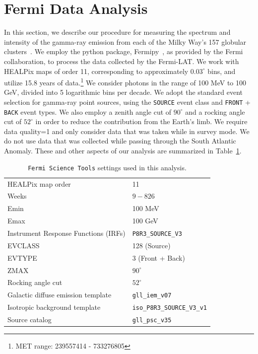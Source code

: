 \section{Fermi Data Analysis}
\label{sec:fermi-data-analysis}


In this section, we describe our procedure for measuring the spectrum and intensity of the gamma-ray emission from each of the Milky Way's 157 globular clusters~\cite{harris2010newcatalogglobularclusters}.
We employ the python package, Fermipy~\cite{wood2017fermipyopensourcepythonpackage}, as provided by the Fermi collaboration, to process the data collected by the Fermi-LAT. 
We work with HEALPix maps of order 11, corresponding to approximately $0.03^{\circ}$ bins, and utilize 15.8 years of data.\footnote{MET range:  239557414 - 733276805} We consider photons in the range of 100 MeV to 100 GeV, divided into 5 logarithmic bins per decade. We adopt the standard event selection for gamma-ray point sources, using the \verb|SOURCE| event class and \verb|FRONT| + \verb|BACK| event types. We also employ a zenith angle cut of $90^{\circ}$ and a rocking angle cut of $52^{\circ}$ in order to reduce the contribution from the Earth's limb. We require data quality=1 and only consider data that was taken while in survey mode. We do not use data that was collected while passing through the South Atlantic Anomaly. These and other aspects of our analysis are summarized in Table~\ref{tab:msp:settings}.

\begin{table}[t]
\centering
\begin{tabular}{ | l| l|  }
\hline
HEALPix map order& 11  \\ 
Weeks & $9-826$  \\ 
Emin & 100 MeV \\
Emax & 100 GeV \\
Instrument Response Functions (IRFs) & \verb|P8R3_SOURCE_V3| \\
EVCLASS & 128 (Source)  \\ 
EVTYPE & 3 (Front + Back)  \\
ZMAX & $90^{\circ}$ \\
Rocking angle cut & $52^{\circ}$ \\
Galactic diffuse emission template & \verb|gll_iem_v07| \\
Isotropic background template & \verb|iso_P8R3_SOURCE_V3_v1| \\
Source catalog & \verb|gll_psc_v35| \\ 
\hline
\end{tabular}
\caption{{\tt Fermi Science Tools} settings used in this analysis. }
\label{tab:msp:settings}
\end{table}


